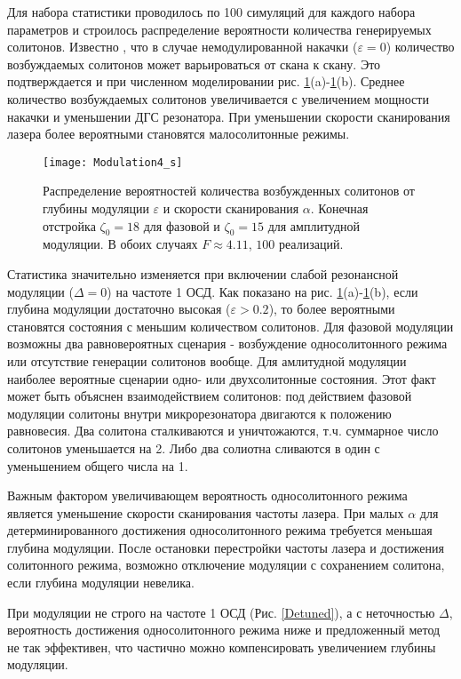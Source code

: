 Для набора статистики проводилось по 100 симуляций для каждого набора параметров и строилось распределение вероятности количества генерируемых солитонов. Известно \cite{Herr2014, Karpov2016}, что в случае немодулированной накачки ($\varepsilon=0$) количество возбуждаемых солитонов может варьироваться от скана к скану. Это подтверждается и при численном моделировании рис. \ref{Mod4}(a)-\ref{Mod4}(b). Среднее количество возбуждаемых солитонов увеличивается с увеличением мощности накачки и уменьшении ДГС резонатора. При уменьшении скорости сканирования лазера более вероятными становятся малосолитонные режимы.

\begin{figure}[ht]
\centering
  \texttt{[image: Modulation4\_s]}
  \caption{Распределение вероятностей количества возбужденных солитонов от глубины модуляции $\varepsilon$ и скорости сканирования $\alpha$. Конечная отстройка $\zeta_0=18$ для фазовой и $\zeta_0=15$ для амплитудной модуляции. В обоих случаях $F\approx 4.11$, $100$ реализаций.}
  \label{Mod4}
\end{figure}

Статистика значительно изменяется при включении слабой резонансной модуляции ($\Delta=0$) на частоте 1 ОСД. Как показано на рис. \ref{Mod4}(a)-\ref{Mod4}(b), если глубина модуляции достаточно высокая ($\varepsilon> 0.2$), то более вероятными становятся состояния с меньшим количеством солитонов. Для фазовой модуляции возможны два равновероятных сценария - возбуждение односолитонного режима или отсутствие генерации солитонов вообще. Для амлитудной модуляции наиболее вероятные сценарии одно- или двухсолитонные состояния. Этот факт может быть объяснен взаимодействием солитонов: под действием фазовой модуляции солитоны внутри микрорезонатора двигаются к положению равновесия. Два солитона сталкиваются и уничтожаются, т.ч. суммарное число солитонов уменьшается на 2. Либо два солиотна сливаются в один с уменьшением общего числа на 1.

Важным фактором увеличивающем вероятность односолитонного режима является уменьшение скорости сканирования частоты лазера. При малых $\alpha$ для детерминированного достижения односолитонного режима требуется меньшая глубина модуляции. После остановки перестройки частоты лазера и достижения солитонного режима, возможно отключение модуляции с сохранением солитона, если глубина модуляции невелика.

При модуляции не строго на частоте 1 ОСД (Рис. \ref{Detuned}), а с неточностью $\Delta$, вероятность достижения односолитонного режима ниже и предложенный метод не так эффективен, что частично можно компенсировать увеличением глубины модуляции.

